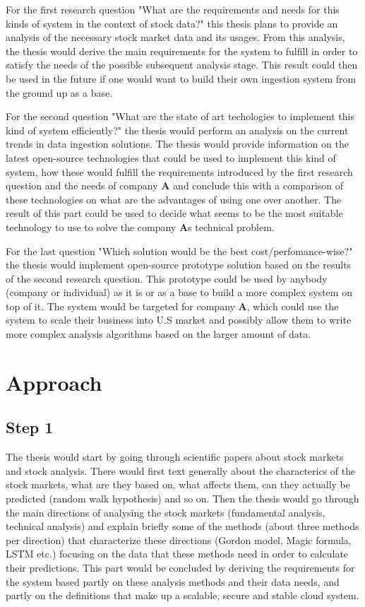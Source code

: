 \documentclass[article,11pt]{article}
\begin{document}
For the first research question "What are the requirements and needs for this kinds of system in the context of stock data?" this thesis plans to provide an analysis of the necessary stock market data and its usages.
From this analysis, the thesis would derive the main requirements for the system to fulfill in order to satisfy the needs of the possible subsequent analysis stage.
This result could then be used in the future if one would want to build their own ingestion system from the ground up as a base.

For the second question "What are the state of art techologies to implement this kind of system efficiently?" the thesis would perform an analysis on the current trends in data ingestion solutions.
The thesis would provide information on the latest open-source technologies that could be used to implement this kind of system, how these would fulfill the requirements introduced by the first research question and the needs of company \textbf{A} and conclude this with a comparison of these technologies on what are the advantages of using one over another.
The result of this part could be used to decide what seems to be the most suitable technology to use to solve the company \textbf{A}s technical problem. 

For the last question "Which solution would be the best cost/perfomance-wise?" the thesis would implement open-source prototype solution based on the results of the second research question.
This prototype could be used by anybody (company or individual) as it is or as a base to build a more complex system on top of it.
The system would be targeted for company \textbf{A}, which could use the system to scale their business into U.S market and possibly allow them to write more complex analysis algorithms based on the larger amount of data.

\section{Approach}

\subsection*{Step 1}

The thesis would start by going through scientific papers about stock markets and stock analysis.
There would first text generally about the characterics of the stock markets, what are they based on, what affects them, can they actually be predicted (random walk hypothesis) and so on.
Then the thesis would go through the main directions of analysing the stock markets (fundamental analysis, technical analysis) and explain briefly some of the methods (about three methods per direction) that characterize these directions (Gordon model, Magic formula, LSTM etc.) focusing on the data that these methods need in order to calculate their predictions.
This part would be concluded by deriving the requirements for the system based partly on these analysis methods and their data needs, and partly on the definitions that make up a scalable, secure and stable cloud system.
\end{document}
